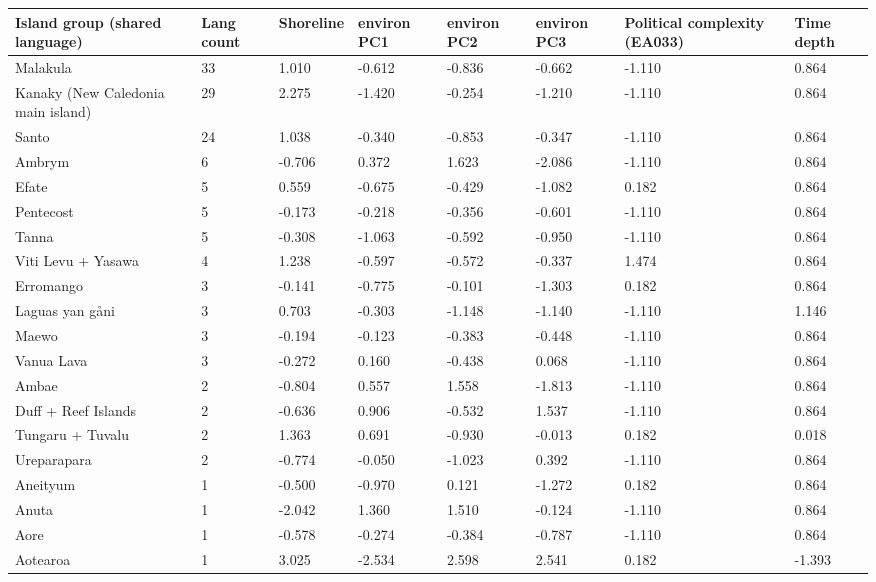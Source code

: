 \begin{longtable}{p{4.5cm}p{1.4cm}p{1.4cm}p{1.4cm}p{1.4cm}p{1.7cm}p{1.7cm}p{1.7cm}}
  \toprule
Island group (shared language) & Lang count & Shoreline & environ PC1 & environ PC2 & environ PC3 & Political complexity (EA033) & Time depth \\ 
  \midrule
Malakula & 33 & 1.010 & -0.612 & -0.836 & -0.662 & -1.110 & 0.864 \\ 
  Kanaky (New Caledonia main island) & 29 & 2.275 & -1.420 & -0.254 & -1.210 & -1.110 & 0.864 \\ 
  Santo & 24 & 1.038 & -0.340 & -0.853 & -0.347 & -1.110 & 0.864 \\ 
  Ambrym & 6 & -0.706 & 0.372 & 1.623 & -2.086 & -1.110 & 0.864 \\ 
  Efate & 5 & 0.559 & -0.675 & -0.429 & -1.082 & 0.182 & 0.864 \\ 
  Pentecost & 5 & -0.173 & -0.218 & -0.356 & -0.601 & -1.110 & 0.864 \\ 
  Tanna & 5 & -0.308 & -1.063 & -0.592 & -0.950 & -1.110 & 0.864 \\ 
  Viti Levu + Yasawa & 4 & 1.238 & -0.597 & -0.572 & -0.337 & 1.474 & 0.864 \\ 
  Erromango & 3 & -0.141 & -0.775 & -0.101 & -1.303 & 0.182 & 0.864 \\ 
  Laguas yan gåni & 3 & 0.703 & -0.303 & -1.148 & -1.140 & -1.110 & 1.146 \\ 
  Maewo & 3 & -0.194 & -0.123 & -0.383 & -0.448 & -1.110 & 0.864 \\ 
  Vanua Lava & 3 & -0.272 & 0.160 & -0.438 & 0.068 & -1.110 & 0.864 \\ 
  Ambae & 2 & -0.804 & 0.557 & 1.558 & -1.813 & -1.110 & 0.864 \\ 
  Duff + Reef Islands & 2 & -0.636 & 0.906 & -0.532 & 1.537 & -1.110 & 0.864 \\ 
  Tungaru + Tuvalu & 2 & 1.363 & 0.691 & -0.930 & -0.013 & 0.182 & 0.018 \\ 
  Ureparapara & 2 & -0.774 & -0.050 & -1.023 & 0.392 & -1.110 & 0.864 \\ 
  Aneityum & 1 & -0.500 & -0.970 & 0.121 & -1.272 & 0.182 & 0.864 \\ 
  Anuta & 1 & -2.042 & 1.360 & 1.510 & -0.124 & -1.110 & 0.864 \\ 
  Aore & 1 & -0.578 & -0.274 & -0.384 & -0.787 & -1.110 & 0.864 \\ 
  Aotearoa & 1 & 3.025 & -2.534 & 2.598 & 2.541 & 0.182 & -1.393 \\ 

\end{longtable}
